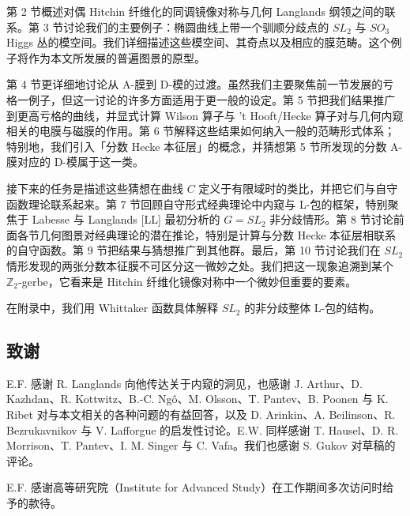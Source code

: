 \documentclass[11pt,a4paper]{article}
\begin{document}
第 2 节概述对偶 Hitchin 纤维化的同调镜像对称与几何 Langlands 纲领之间的联系。第 3 节讨论我们的主要例子：椭圆曲线上带一个驯顺分歧点的 $SL_2$ 与 $SO_3$ Higgs 丛的模空间。我们详细描述这些模空间、其奇点以及相应的膜范畴。这个例子将作为本文所发展的普遍图景的原型。

第 4 节更详细地讨论从 A-膜到 D-模的过渡。虽然我们主要聚焦前一节发展的亏格一例子，但这一讨论的许多方面适用于更一般的设定。第 5 节把我们结果推广到更高亏格的曲线，并显式计算 Wilson 算子与 't Hooft/Hecke 算子对与几何内窥相关的电膜与磁膜的作用。第 6 节解释这些结果如何纳入一般的范畴形式体系；特别地，我们引入「分数 Hecke 本征层」的概念，并猜想第 5 节所发现的分数 A-膜对应的 D-模属于这一类。

接下来的任务是描述这些猜想在曲线 $C$ 定义于有限域时的类比，并把它们与自守函数理论联系起来。第 7 节回顾自守形式经典理论中内窥与 L-包的框架，特别聚焦于 Labesse 与 Langlands [LL] 最初分析的 $G=SL_2$ 非分歧情形。第 8 节讨论前面各节几何图景对经典理论的潜在推论，特别是计算与分数 Hecke 本征层相联系的自守函数。第 9 节把结果与猜想推广到其他群。最后，第 10 节讨论我们在 $SL_2$ 情形发现的两张分数本征膜不可区分这一微妙之处。我们把这一现象追溯到某个 $\mathbb{Z}_2$-gerbe，它看来是 Hitchin 纤维化镜像对称中一个微妙但重要的要素。

在附录中，我们用 Whittaker 函数具体解释 $SL_2$ 的非分歧整体 L-包的结构。

\subsection{致谢}

E.F. 感谢 R. Langlands 向他传达关于内窥的洞见，也感谢 J. Arthur、D. Kazhdan、R. Kottwitz、B.-C. Ngô、M. Olsson、T. Pantev、B. Poonen 与 K. Ribet 对与本文相关的各种问题的有益回答，以及 D. Arinkin、A. Beilinson、R. Bezrukavnikov 与 V. Lafforgue 的启发性讨论。E.W. 同样感谢 T. Hausel、D. R. Morrison、T. Pantev、I. M. Singer 与 C. Vafa。我们也感谢 S. Gukov 对草稿的评论。

E.F. 感谢高等研究院（Institute for Advanced Study）在工作期间多次访问时给予的款待。


\end{document}
